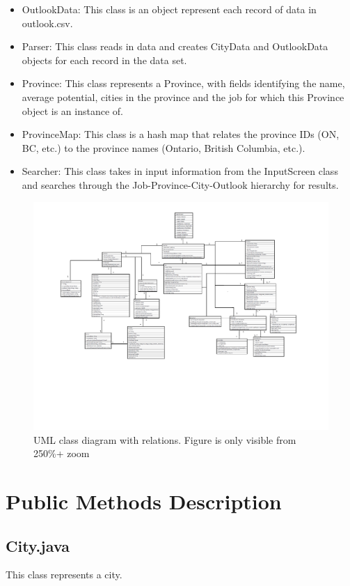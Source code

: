 \documentclass[12pt,fleqn]{article}
\begin{document}
\begin{itemize}
\item OutlookData: This class is an object represent each record of data in outlook.csv.
\item Parser: This class reads in data and creates CityData and OutlookData objects for each record in the data set.
\item Province: This class represents a Province, with fields identifying the name, average potential, cities in the province and the job for which this Province object is an instance of.
\item ProvinceMap: This class is a hash map that relates the province IDs (ON, BC, etc.) to the province names (Ontario, British Columbia, etc.).
\item Searcher: This class takes in input information from the InputScreen class and searches through the Job-Province-City-Outlook hierarchy for results.
\end{itemize}


\begin{figure}[hp!]
\caption{UML class diagram with relations. Figure is only visible from 250\%+ zoom}
  \hspace*{-4.4cm}\includegraphics[width = 260mm]{Group04_Classes_Diagram.pdf}
\end{figure}



\newpage
\section*{Public Methods Description}\label{public}
\subsection*{City.java}\label{city}
This class represents a city.
\end{document}
